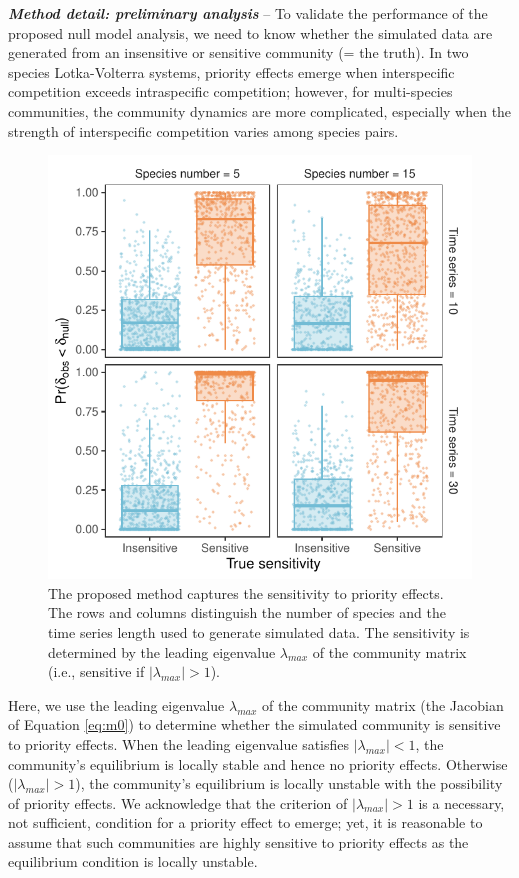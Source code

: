 \documentclass[12pt, class=article, crop=false]{standalone}
\begin{document}
\textbf{\textit{Method detail: preliminary analysis}} -- 
To validate the performance of the proposed null model analysis, we need to know whether the simulated data are generated from an insensitive or sensitive community (= the truth).
In two species Lotka-Volterra systems, priority effects emerge when interspecific competition exceeds intraspecific competition; however, for multi-species communities, the community dynamics are more complicated, especially when the strength of interspecific competition varies among species pairs.

\begin{figure}
    \includegraphics[scale=0.75]{output/figure_eigen.pdf}
    \caption{The proposed method captures the sensitivity to priority effects. The rows and columns distinguish the number of species and the time series length used to generate simulated data. The sensitivity is determined by the leading eigenvalue $\lambda_{max}$ of the community matrix (i.e., sensitive if $|\lambda_{max}| > 1$).}
    \label{fig:box}
\end{figure}

Here, we use the leading eigenvalue $\lambda_{max}$ of the community matrix (the Jacobian of Equation \ref{eq:m0}) to determine whether the simulated community is sensitive to priority effects.
When the leading eigenvalue satisfies $|\lambda_{max}| < 1$, the community's equilibrium is locally stable and hence no priority effects.
Otherwise ($|\lambda_{max}| > 1$), the community's equilibrium is locally unstable with the possibility of priority effects.
We acknowledge that the criterion of $|\lambda_{max}| > 1$ is a necessary, not sufficient, condition for a priority effect to emerge; yet, it is reasonable to assume that such communities are highly sensitive to priority effects as the equilibrium condition is locally unstable. 
\end{document}
